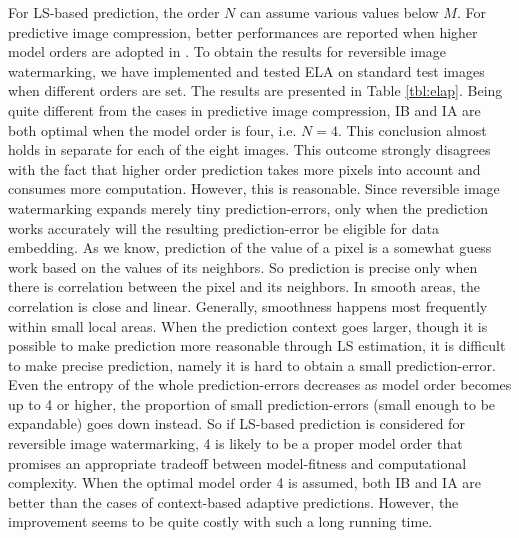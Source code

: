 \documentclass[journal]{IEEEtran}
\begin{document}
For LS-based prediction, the order $N$ can assume various values below $M$. For predictive image
compression, better performances are reported when higher model orders are adopted in
\cite{Kau05lsap}. To obtain the results for reversible image watermarking, we have implemented and
tested ELA on standard test images when different orders are set. The results are presented in Table
\ref{tbl:elap}. Being quite different from the cases in predictive image compression, IB and IA are
both optimal when the model order is four, i.e. $N=4$. This conclusion almost holds in separate for
each of the eight images. This outcome strongly disagrees with the fact that higher order prediction
takes more pixels into account and consumes more computation. However, this is reasonable. Since
reversible image watermarking expands merely tiny prediction-errors, only when the prediction works
accurately will the resulting prediction-error be eligible for data embedding.  As we know,
prediction of the value of a pixel is a somewhat guess work based on the values of its neighbors. So
prediction is precise only when there is correlation between the pixel and its neighbors. In smooth
areas, the correlation is close and linear. Generally, smoothness happens most frequently within
small local areas. When the prediction context goes larger, though it is possible to make prediction
more reasonable through LS estimation, it is difficult to make precise prediction, namely it is hard
to obtain a small prediction-error. Even the entropy of the whole prediction-errors decreases as
model order becomes up to 4 or higher, the proportion of small prediction-errors (small enough to be
expandable) goes down instead. So if LS-based prediction is considered for reversible image
watermarking, 4 is likely to be a proper model order that promises an appropriate tradeoff between
model-fitness and computational complexity. When the optimal model order 4 is assumed, both IB and
IA are better than the cases of context-based adaptive predictions.  However, the improvement seems
to be quite costly with such a long running time. 
\end{document}
